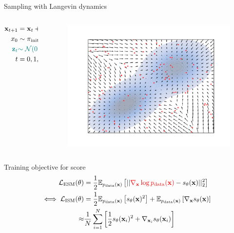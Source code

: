 \documentclass[aspectratio=169,xcolor=dvipsnames]{beamer}
\newcommand{\bx}{\mathbf{x}}
\newcommand{\nbx}{\nabla_{\bx}}
\begin{document}
\begin{frame}{Sampling with Langevin dynamics}
  \begin{columns}
    \begin{column}{0.5\textwidth}
      \begin{align*}
        \bx_{t+1} &= \bx_{t} + \alpha \cdot s_\theta(\bx_t) + \textcolor{teal}{\alpha \epsilon \cdot \mathbf{z}_t} \\
        x_0 &\sim \pi_{\text{init}}\\
        \textcolor{teal}{\textbf{z}_t} &\textcolor{teal}{\sim \mathcal{N}(0, 1)}\\
        t &= 0, 1, \dots T \to \infty
      \end{align*}
    \end{column}
    \begin{column}{0.5\textwidth}
      \centering
      \begin{figure}
        \centering
        \includegraphics[width=\textwidth]{figs/gen/gaussian_mixture_score_init.png}
      \end{figure}
    \end{column}
  \end{columns}
\end{frame}

\begin{frame}{Training objective for score}
\begin{align*}
      \mathcal{L}_\text{ESM} (\theta) &= \frac{1}{2}\mathbb{E}_{p_\text{data}(\bx)} \left[ || \textcolor{red}{\nbx \log p_\text{data}(\bx)} - s_\theta(\bx) ||_2^2\right]\\
      \iff \mathcal{L}_\text{ISM}(\theta) &= \frac{1}{2}\mathbb{E}_{p_\text{data}(\bx)} \left[ s_\theta(\bx)^2\right] + \mathbb{E}_{p_\text{data}(\bx)}\left[\nbx s_\theta(\bx) \right]\\
      \approx & \frac{1}{N} \sum\limits_{i=1}^{N}  \left[\frac{1}{2} s_\theta(\bx_i)^2 + \nabla_{\bx_i} s_\theta(\bx_i)  \right]
  \end{align*}
\end{frame}
\end{document}
